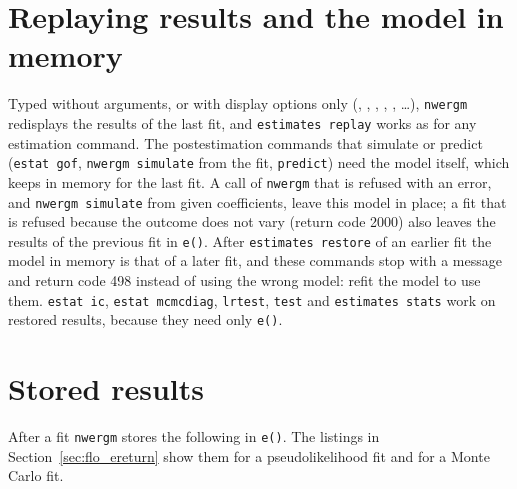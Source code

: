 \section{Replaying results and the model in memory}\label{sec:replay}

Typed without arguments, or with display options only (, , , , , \ldots), \texttt{nwergm} redisplays the results of the last fit, and \texttt{estimates replay} works as for any estimation command. The postestimation commands that simulate or predict (\texttt{estat gof}, \texttt{nwergm simulate} from the fit, \texttt{predict}) need the model itself, which \nwergm{} keeps in memory for the last fit. A call of \texttt{nwergm} that is refused with an error, and \texttt{nwergm simulate} from given coefficients, leave this model in place; a fit that is refused because the outcome does not vary (return code 2000) also leaves the results of the previous fit in \texttt{e()}. After \texttt{estimates restore} of an earlier fit the model in memory is that of a later fit, and these commands stop with a message and return code 498 instead of using the wrong model: refit the model to use them. \texttt{estat ic}, \texttt{estat mcmcdiag}, \texttt{lrtest}, \texttt{test} and \texttt{estimates stats} work on restored results, because they need only \texttt{e()}.

\section{Stored results}\label{sec:stored}

After a fit \texttt{nwergm} stores the following in \texttt{e()}. The listings in Section~\ref{sec:flo_ereturn} show them for a pseudolikelihood fit and for a Monte Carlo fit.

